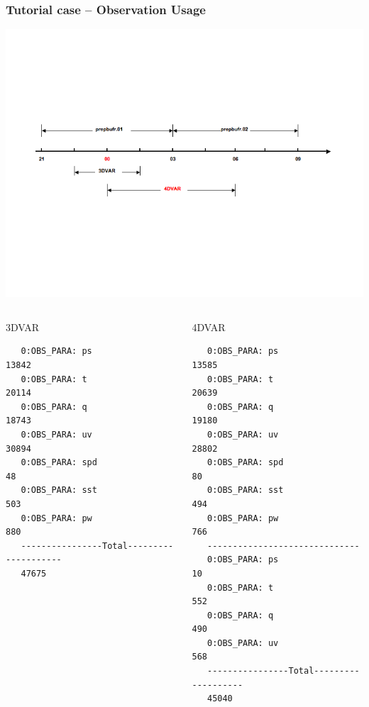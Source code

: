 \documentclass[10pt]{beamer}
\begin{document}
\begin{frame}[fragile]
\frametitle{Tutorial case -- Observation Usage}
\begin{center}
\includegraphics[scale=0.40, trim=25 200 50 150, clip]{obs_usage} 
\end{center}\pause
\begin{columns}[c]
\column{5cm}
\begin{beamerboxesrounded}[ lower=postit,shadow=true]{3DVAR}
{\tiny
\begin{verbatim}
   0:OBS_PARA: ps                       13842
   0:OBS_PARA: t                        20114
   0:OBS_PARA: q                        18743
   0:OBS_PARA: uv                       30894
   0:OBS_PARA: spd                         48
   0:OBS_PARA: sst                        503
   0:OBS_PARA: pw                         880
   ----------------Total--------------------
   47675
\end{verbatim}
}
\end{beamerboxesrounded}
\column{5cm}
\begin{beamerboxesrounded}[ lower=postit,shadow=true]{4DVAR}
{\tiny
\begin{verbatim}
   0:OBS_PARA: ps                       13585
   0:OBS_PARA: t                        20639
   0:OBS_PARA: q                        19180
   0:OBS_PARA: uv                       28802
   0:OBS_PARA: spd                         80
   0:OBS_PARA: sst                        494
   0:OBS_PARA: pw                         766
   ------------------------------
   0:OBS_PARA: ps                          10
   0:OBS_PARA: t                          552
   0:OBS_PARA: q                          490
   0:OBS_PARA: uv                         568
   ----------------Total-------------------
   45040
\end{verbatim}
}
\end{beamerboxesrounded}
\end{columns}
\end{frame}
\end{document}
